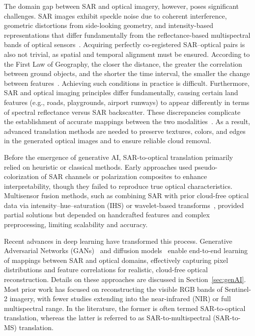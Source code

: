 The domain gap between SAR and optical imagery, however, poses significant challenges. SAR images exhibit speckle noise due to coherent interference, geometric distortions from side-looking geometry, and intensity-based representations that differ fundamentally from the reflectance-based multispectral bands of optical sensors~\cite{sar2opt_cGAN_Optim_oppr_limits}. Acquiring perfectly co-registered SAR–optical pairs is also not trivial, as spatial and temporal alignment must be ensured. According to the First Law of Geography, the closer the distance, the greater the correlation between ground objects, and the shorter the time interval, the smaller the change between features~\cite{sar_2_opt_CGAN_survey_taxonomy}. Achieving such conditions in practice is difficult. Furthermore, SAR and optical imaging principles differ fundamentally, causing certain land features (e.g., roads, playgrounds, airport runways) to appear differently in terms of spectral reflectance versus SAR backscatter. These discrepancies complicate the establishment of accurate mappings between the two modalities~\cite{sar_2_opt_CGAN_survey_taxonomy}. As a result, advanced translation methods are needed to preserve textures, colors, and edges in the generated optical images and to ensure reliable cloud removal.

Before the emergence of generative AI, SAR-to-optical translation primarily relied on heuristic or classical methods. Early approaches used pseudo-colorization of SAR channels or polarization composites to enhance interpretability, though they failed to reproduce true optical characteristics. Multisensor fusion methods, such as combining SAR with prior cloud-free optical data via intensity–hue–saturation (IHS) or wavelet-based transforms~\cite{IHS_wavelet_Zhang2019}, provided partial solutions but depended on handcrafted features and complex preprocessing, limiting scalability and accuracy.

Recent advances in deep learning have transformed this process. Generative Adversarial Networks (GANs)~\cite{GANs_Goodfellow} and diffusion models~\cite{DDPM_2020} enable end-to-end learning of mappings between SAR and optical domains, effectively capturing pixel distributions and feature correlations for realistic, cloud-free optical reconstruction. Details on these approaches are discussed in Section~\ref{sec:genAI}.
Most prior work has focused on reconstructing the visible RGB bands of Sentinel-2 imagery, with fewer studies extending into the near-infrared (NIR) or full multispectral range. In the literature, the former is often termed SAR-to-optical translation, whereas the latter is referred to as SAR-to-multispectral (SAR-to-MS) translation.


